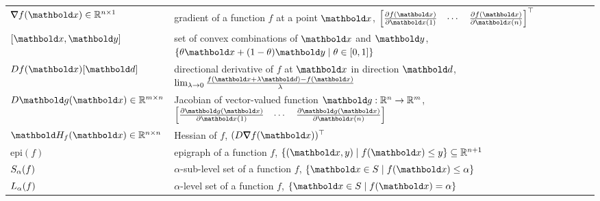 \begin{fullwidth}
\vspace{0.5cm}\section*{}\vspace{-0.5cm}
\begin{longtable}{p{2.5cm}l}
   $\grad f(\vx) \in \R^{n \times 1}$ & gradient of a function $f$ at a point $\vx$, $\trans{\begin{bmatrix}
        \pdv{f(\vx)}{\vx(1)} & \cdots & \pdv{f(\vx)}{\vx(n)}
    \end{bmatrix}}$ \\
   $[\vx,\vy]$ & set of convex combinations of $\vx$ and $\vy$, $\{\theta\vx + (1-\theta)\vy \mid \theta\in[0,1]\}$ \\
   $D f(\vx)[\vd]$ & directional derivative of $f$ at $\vx$ in direction $\vd$, $\lim_{\lambda \to 0} \frac{f(\vx + \lambda\vd) - f(\vx)}{\lambda}$ \\
   $D \vg(\vx) \in \R^{m \times n}$ & Jacobian of vector-valued function $\vg: \R^n \to \R^m$, $\begin{bmatrix}
        \pdv{\vg(\vx)}{\vx(1)} & \cdots & \pdv{\vg(\vx)}{\vx(n)}
    \end{bmatrix}$ \\
   $\mH_f(\vx) \in \R^{n \times n}$ & Hessian of $f$, $\trans{(D \grad f(\vx))}$ \\
   \addlinespace
   $\mathrm{epi}(f)$ & epigraph of a function $f$, $\{(\vx,y) \mid f(\vx) \leq y\} \subseteq \R^{n+1}$ \\
   $S_\alpha(f)$ & $\alpha$-sub-level set of a function $f$, $\{\vx \in \sS \mid f(\vx) \leq \alpha\}$ \\
   $L_\alpha(f)$ & $\alpha$-level set of a function $f$, $\{\vx \in \sS \mid f(\vx) = \alpha\}$ \\
\end{longtable}


\end{fullwidth}
